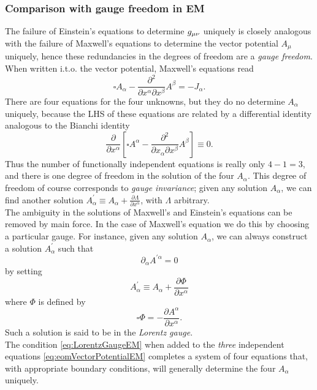 \subsubsection{Comparison with gauge freedom in EM}
The failure of Einstein's equations to determine $g_{\mu \nu}$ uniquely is closely analogous with the failure of Maxwell's equations to determine the vector potential $A_\mu$ uniquely, hence these redundancies in the degrees of freedom are a \emph{gauge freedom}. When written i.t.o. the vector potential, Maxwell's equations read
\begin{equation}
\label{eq:eomVectorPotentialEM}
\square A_\alpha - \frac{\partial^2}{\partial x^\alpha \partial x^\beta} A^\beta = - J_\alpha.
\end{equation}
There are four equations for the four unknowns, but they do no determine $A_\alpha$ uniquely, because the LHS of these equations are related by a differential identity analogous to the Bianchi identity
\begin{equation}
\frac{\partial}{\partial x^\alpha} \left[\square A^\alpha - \frac{\partial^2}{\partial x_\alpha \partial x^\beta} A^\beta \right] \equiv 0.
\end{equation}
Thus the number of functionally independent equations is really only $4-1=3$, and there is one degree of freedom in the solution of the four $A_\alpha$. This degree of freedom of course corresponds to \emph{gauge invariance}; given any solution $A_\alpha$, we can find another solution $A^\prime_\alpha \equiv A_\alpha + \frac{\partial \Lambda}{\partial x^\alpha}$, with $\Lambda$ arbitrary.\\
The ambiguity in the solutions of Maxwell's and Einstein's equations can be removed by main force. In the case of Maxwell's equation we do this by choosing a particular gauge. For instance, given any solution $A_\alpha$, we can always construct a solution $A^\prime_\alpha$ such that
\begin{equation}
\label{eq:LorentzGaugeEM}
\partial_\alpha A^{\prime \alpha} =0
\end{equation} 
by setting
\begin{equation}
A^\prime_\alpha \equiv A_\alpha + \frac{\partial \Phi}{\partial x^\alpha}
\end{equation}
where $\Phi$ is defined by
\begin{equation}
\square\Phi = - \frac{\partial A^\alpha}{ \partial x^\alpha}.
\end{equation}
Such a solution is said to be in the \emph{Lorentz gauge}.\\
The condition \ref{eq:LorentzGaugeEM} when added to the \emph{three} independent equations \ref{eq:eomVectorPotentialEM} completes a system of four equations that, with appropriate boundary conditions, will generally determine the four $A_\alpha$ uniquely.
